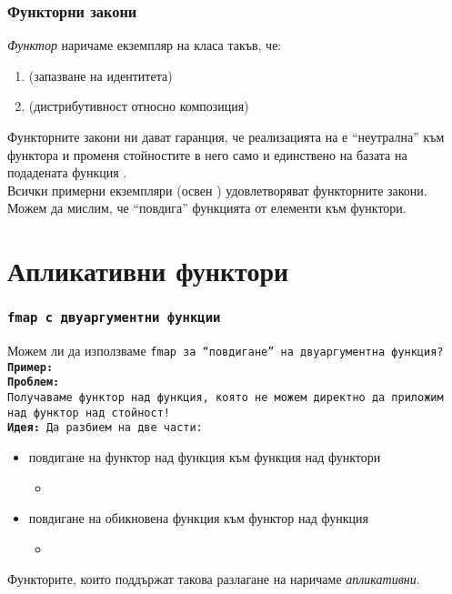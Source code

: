 \documentclass[alsotrans]{beamerswitch}
\begin{document}
\begin{frame}
  \frametitle{Функторни закони}
  \begin{definition}
    \emph{Функтор} наричаме екземпляр на класа  такъв, че:
    \begin{enumerate}
    \item {} \eqv {} (запазване на идентитета)
    \item {} \eqv {} (дистрибутивност относно композиция)
    \end{enumerate}
  \end{definition}
  \pause
  Функторните закони ни дават гаранция, че реализацията на  е ``неутрална'' към функтора и променя стойностите в него само и единствено на базата на подадената функция .\\
  \pause
  Всички примерни екземпляри (освен ) удовлетворяват функторните закони.\\
  \pause
  Можем да мислим, че  ``повдига'' функцията  от елементи към функтори.
\end{frame}

\section{Апликативни функтори}

\begin{frame}
  \frametitle{\tt{fmap} с двуаргументни функции}
  Можем ли да използваме \tt{fmap} за ``повдигане'' на двуаргументна функция?\\
  \pause
  \onslide<+->
  \textbf{Пример:} \\
  \onslide<+->
  \textbf{Проблем:} \\
  \onslide<+->
  Получаваме функтор над функция, която не можем директно да приложим над функтор над стойност!\\
  \onslide<+->
  \textbf{Идея:} Да разбием  на две части:
  \begin{itemize}[<+->]
  \item повдигане на функтор над функция към функция над функтори
    \begin{itemize}
    \item {}
    \end{itemize}
  \item повдигане на обикновена функция към функтор над функция
    \begin{itemize}
    \item {} 
    \end{itemize}
  \end{itemize}
  \onslide<+->
  Функторите, които поддържат такова разлагане на  наричаме \emph{апликативни}.
\end{frame}
\end{document}
